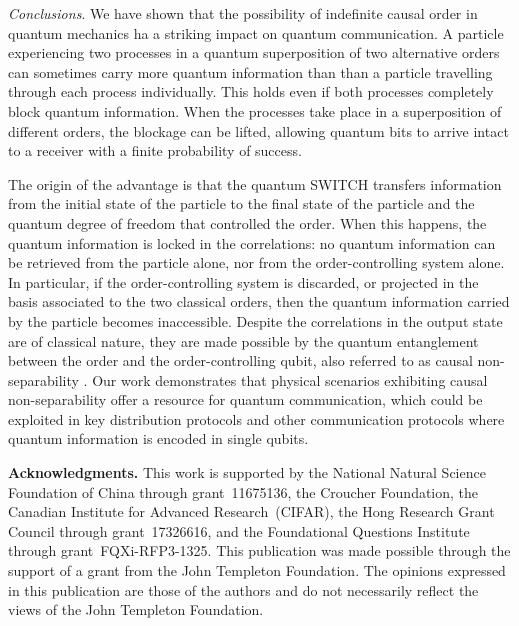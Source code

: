\documentclass[aps,prl,twocolumn,superscriptaddress,groupedaddress]{revtex4}
\begin{document}
{\em Conclusions}. We have shown that the possibility of indefinite causal order in quantum mechanics ha a striking impact on  quantum communication.  A  particle experiencing two processes in a quantum superposition of two alternative orders can sometimes carry more quantum information than than a particle travelling through each process individually. This holds even if both processes completely block  quantum information.  When the  processes take place in a superposition of different orders, the blockage can be lifted, allowing quantum bits to arrive intact to a receiver with a finite probability of success.   

The origin of the advantage   is that the quantum SWITCH transfers information from the initial state of the particle to the final state of the particle and the quantum degree of freedom that controlled the order.  When this happens, the quantum information is locked in the correlations: no quantum information can be retrieved from the particle alone, nor from the order-controlling system alone.    In particular,   if the order-controlling system is discarded, or projected in the basis associated to the two classical orders, then the quantum information carried by the particle becomes inaccessible.  Despite the correlations in the output state are of classical nature, they are made possible by the quantum  entanglement between the order and the order-controlling qubit, also referred to as causal non-separability \cite{oreshkov2012quantum,oreshkov2018whereabouts}.       Our work demonstrates that physical scenarios exhibiting  causal non-separability offer a resource for quantum communication, which could be exploited in key distribution protocols and other communication protocols where quantum information is encoded in single qubits. 

\medskip 

{\bf Acknowledgments.} This work is supported by the National
Natural Science Foundation of China through grant~11675136, the Croucher Foundation, the Canadian Institute for Advanced Research~(CIFAR), the Hong Research Grant Council through grant~17326616, and the Foundational
Questions Institute through grant~FQXi-RFP3-1325. This publication was made possible through the support of a grant from the John Templeton Foundation. The opinions expressed in this publication are those of the
authors and do not necessarily reflect the views of the John Templeton Foundation. 
\end{document}
